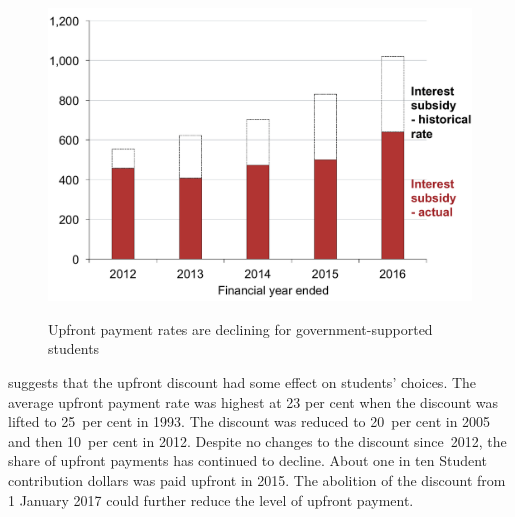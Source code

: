 \documentclass{grattan}
\begin{document}
\begin{figure}
\caption{Upfront payment rates are declining for government-supported students}\label{fig:fig6-upfront-payment-rates-are-declining-for-govt-supported-students}

\includegraphics[page=6]{atlas/Chartpack.pdf}

{\textcites{EducationvariousyearsHighereducationreport}{Education2016StudentsSelectedhigher}}
\end{figure}

 suggests that the upfront discount had some effect on students' choices.
The average upfront payment rate was highest at 23 per cent when the discount was lifted to 25~per cent in 1993.
The discount was reduced to 20~per cent in 2005 and then 10~per cent in 2012. Despite no changes to the discount since~2012, the share of upfront payments has continued to decline.
About one in ten \gls{Student contribution} dollars was paid upfront in 2015.
The abolition of the discount from 1 January 2017 could further reduce the level of upfront payment.
\end{document}
